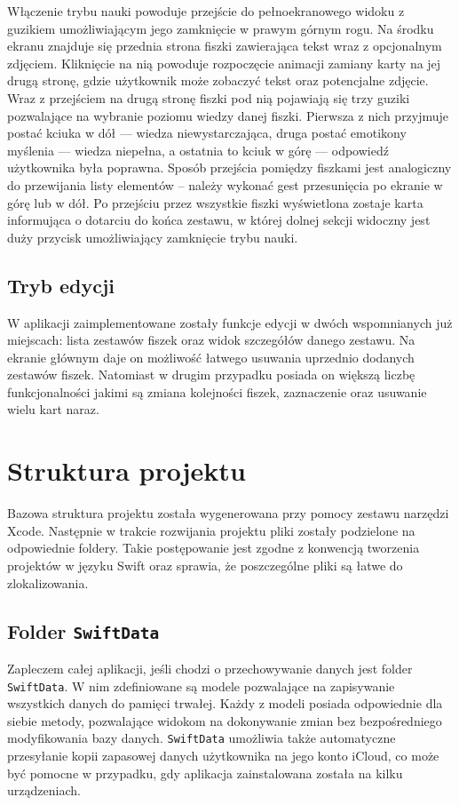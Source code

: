 \documentclass[final,a4paper,openany,12pt]{mwbk}
\begin{document}
Włączenie trybu nauki powoduje przejście do pełnoekranowego widoku z guzikiem umożliwiającym jego zamknięcie w prawym górnym rogu. Na środku ekranu znajduje się przednia strona fiszki zawierająca tekst wraz z opcjonalnym zdjęciem. Kliknięcie na nią powoduje rozpoczęcie animacji zamiany karty na jej drugą stronę, gdzie użytkownik może zobaczyć tekst oraz potencjalne zdjęcie. Wraz z przejściem na drugą stronę fiszki pod nią pojawiają się trzy guziki pozwalające na wybranie poziomu wiedzy danej fiszki. Pierwsza z nich przyjmuje postać kciuka w dół --- wiedza niewystarczająca, druga postać emotikony myślenia --- wiedza niepełna, a ostatnia to kciuk w górę --- odpowiedź użytkownika była poprawna. Sposób przejścia pomiędzy fiszkami jest analogiczny do przewijania listy elementów -- należy wykonać gest przesunięcia po ekranie w górę lub w dół. Po przejściu przez wszystkie fiszki wyświetlona zostaje karta informująca o dotarciu do końca zestawu, w której dolnej sekcji widoczny jest duży przycisk umożliwiający zamknięcie trybu nauki. 

\section{Tryb edycji}

W aplikacji zaimplementowane zostały funkcje edycji w dwóch wspomnianych już miejscach: lista zestawów fiszek oraz widok szczegółów danego zestawu. Na ekranie głównym daje on możliwość łatwego usuwania uprzednio dodanych zestawów fiszek. Natomiast w drugim przypadku posiada on większą liczbę funkcjonalności jakimi są zmiana kolejności fiszek, zaznaczenie oraz usuwanie wielu kart naraz.


\chapter{Struktura projektu}

Bazowa struktura projektu została wygenerowana przy pomocy zestawu narzędzi Xcode. Następnie w trakcie rozwijania projektu pliki zostały podzielone na odpowiednie foldery. Takie postępowanie jest zgodne z konwencją tworzenia projektów w języku Swift oraz sprawia, że poszczególne pliki są łatwe do zlokalizowania.


\section{Folder \texttt{SwiftData}}

Zapleczem całej aplikacji, jeśli chodzi o przechowywanie danych jest folder \texttt{SwiftData}. W nim zdefiniowane są modele pozwalające na zapisywanie wszystkich danych do pamięci trwałej. Każdy z modeli posiada odpowiednie dla siebie metody, pozwalające widokom na dokonywanie zmian bez bezpośredniego modyfikowania bazy danych. \texttt{SwiftData} umożliwia także automatyczne przesyłanie kopii zapasowej danych użytkownika na jego konto iCloud, co może być pomocne w przypadku, gdy aplikacja zainstalowana została na kilku urządzeniach.
\end{document}
